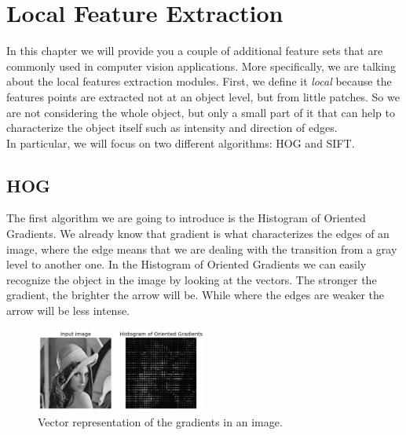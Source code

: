 \chapter{Local Feature Extraction}
In this chapter we will provide you a couple of additional feature sets that are commonly used in computer vision applications.
More specifically, we are talking about the local features extraction modules. 
First, we define it \textit{local} because the features points are extracted not at an object level, but from little patches. 
So we are not considering the whole object, but only a small part of it that can help to characterize the object itself such as intensity and direction of edges.
\\
In particular, we will focus on two different algorithms: HOG and SIFT.
\section{HOG}
The first algorithm we are going to introduce is the Histogram of Oriented Gradients.
We already know that gradient is what characterizes the edges of an image, where the edge means that we are dealing with the transition from a gray level to another one.
In the Histogram of Oriented Gradients we can easily recognize the object in the image by looking at the vectors. The stronger the gradient, the brighter the arrow will be.
While where the edges are weaker the arrow will be less intense.

\begin{figure}[H]
    \centering
    \includegraphics[width=0.5\textwidth]{Figures/HOG.png}
    \caption{Vector representation of the gradients in an image.}
    \label{fig:HOG}
\end{figure}

